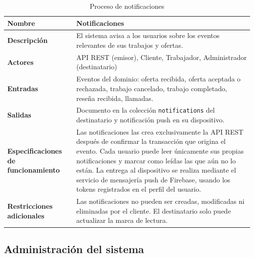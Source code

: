 \documentclass[doc,12pt,a4paper]{apa7}
\begin{document}
\begin{longtable}{|P{3.3cm}|L{11.2cm}|}
\caption{Proceso de notificaciones}\\
\hline
\textbf{Nombre} & Notificaciones \\ \hline
\textbf{Descripción} & El sistema avisa a los usuarios sobre los eventos relevantes de sus trabajos y ofertas. \\ \hline
\textbf{Actores} & API REST (emisor), Cliente, Trabajador, Administrador (destinatario) \\ \hline
\textbf{Entradas} & Eventos del dominio: oferta recibida, oferta aceptada o rechazada, trabajo cancelado, trabajo completado, reseña recibida, llamadas. \\ \hline
\textbf{Salidas} & Documento en la colección \texttt{notifications} del destinatario y notificación push en su dispositivo. \\ \hline
\textbf{Especificaciones de funcionamiento} & Las notificaciones las crea exclusivamente la API REST después de confirmar la transacción que origina el evento. Cada usuario puede leer únicamente sus propias notificaciones y marcar como leídas las que aún no lo están. La entrega al dispositivo se realiza mediante el servicio de mensajería push de Firebase, usando los tokens registrados en el perfil del usuario. \\ \hline
\textbf{Restricciones adicionales} & Las notificaciones no pueden ser creadas, modificadas ni eliminadas por el cliente. El destinatario solo puede actualizar la marca de lectura. \\ \hline
\end{longtable}

\subsection{Administración del sistema}
\end{document}
